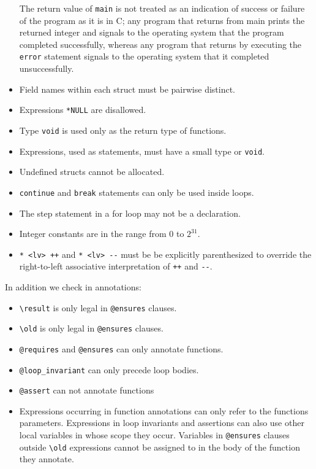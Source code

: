 \documentclass[11pt]{article}
\begin{document}
\begin{itemize}
  The return value of \verb'main' is not treated as an indication of
  success or failure of the program as it is in C; any program that
  returns from main prints the returned integer and signals to the
  operating system that the program completed successfully, whereas
  any program that returns by executing the \verb'error' statement
  signals to the operating system that it completed unsuccessfully.
\item Field names within each struct must be pairwise distinct.
\item Expressions \verb'*NULL' are disallowed.
\item Type \verb'void' is used only as the return type of functions.
\item Expressions, used as statements, must have a small type or \verb'void'.
\item Undefined structs cannot be allocated.
\item \verb'continue' and \verb'break' statements can
  only be used inside loops.
\item The step statement in a for loop may not be a declaration.
\item Integer constants are in the range from $0$ to $2^{31}$.
\item \verb'* <lv> ++' and \verb'* <lv> --' must be
  be explicitly parenthesized to override the right-to-left
  associative interpretation of \verb'++' and \verb'--'.
\end{itemize}

In addition we check in annotations:
\begin{itemize}
\item \verb'\result' is only legal in \verb'@ensures' clauses.
\item \verb'\old' is only legal in \verb'@ensures' clauses.
\item \verb'@requires' and \verb'@ensures' can only annotate functions.
\item \verb'@loop_invariant' can only precede loop bodies.
\item \verb'@assert' can not annotate functions
\item Expressions occurring in function annotations can only refer to
  the functions parameters.  Expressions in loop invariants and
  assertions can also use other local variables in whose scope they
  occur.  Variables in \verb'@ensures' clauses outside \verb'\old'
  expressions cannot be assigned to in the body of the function they
  annotate.
\end{itemize}
\end{document}
